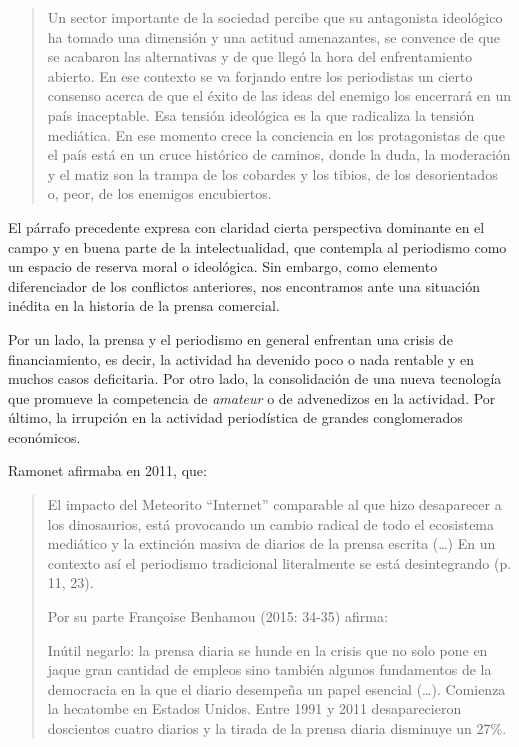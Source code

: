 \begin{quote}
Un sector importante de la sociedad percibe que su antagonista ideológico ha tomado una dimensión y una actitud amenazantes, se convence de que se acabaron las alternativas y de que llegó la hora del enfrentamiento abierto. En ese contexto se va forjando entre los periodistas un cierto consenso acerca de que el éxito de las ideas del enemigo los encerrará en un país inaceptable. Esa tensión ideológica es la que radicaliza la tensión mediática. En ese momento crece la conciencia en los protagonistas de que el país está en un cruce histórico de caminos, donde la duda, la moderación y el matiz son la trampa de los cobardes y los tibios, de los desorientados o, peor, de los enemigos encubiertos.
\end{quote}

El párrafo precedente expresa con claridad cierta perspectiva dominante en el campo y en buena parte de la intelectualidad, que contempla al periodismo como un espacio de reserva moral o ideológica. Sin embargo, como elemento diferenciador de los conflictos anteriores, nos encontramos ante una situación inédita en la historia de la prensa comercial.

Por un lado, la prensa y el periodismo en general enfrentan una crisis de financiamiento, es decir, la actividad ha devenido poco o nada rentable y en muchos casos deficitaria. Por otro lado, la consolidación de una nueva tecnología que promueve la competencia de \emph{amateur} o de advenedizos en la actividad. Por último, la irrupción en la actividad periodística de grandes conglomerados económicos.

Ramonet afirmaba en 2011, que:

\begin{quote}
El impacto del Meteorito \enquote{Internet} comparable al que hizo desaparecer a los dinosaurios, está provocando un cambio radical de todo el ecosistema mediático y la extinción masiva de diarios de la prensa escrita (\ldots) En un contexto así el periodismo tradicional literalmente se está desintegrando (p. 11, 23).

Por su parte Françoise Benhamou (2015: 34-35) afirma:

Inútil negarlo: la prensa diaria se hunde en la crisis que no solo pone en jaque gran cantidad de empleos sino también algunos fundamentos de la democracia en la que el diario desempeña un papel esencial (\ldots). Comienza la hecatombe en Estados Unidos. Entre 1991 y 2011 desaparecieron doscientos cuatro diarios y la tirada de la prensa diaria disminuye un 27\%.
\end{quote}

